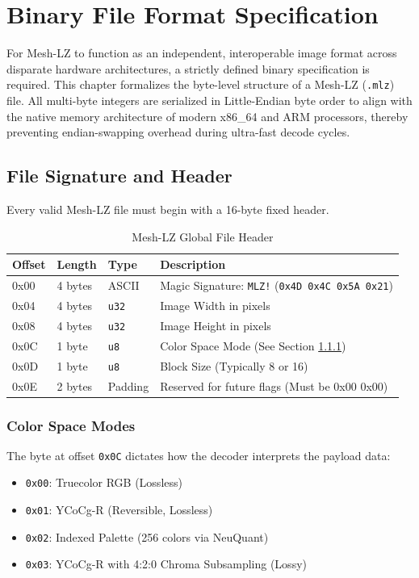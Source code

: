 \chapter{Binary File Format Specification}
\label{ch:spec}

For Mesh-LZ to function as an independent, interoperable image format across disparate hardware architectures, a strictly defined binary specification is required. This chapter formalizes the byte-level structure of a Mesh-LZ (\texttt{.mlz}) file. All multi-byte integers are serialized in Little-Endian byte order to align with the native memory architecture of modern x86\_64 and ARM processors, thereby preventing endian-swapping overhead during ultra-fast decode cycles.

\section{File Signature and Header}
Every valid Mesh-LZ file must begin with a 16-byte fixed header.

\begin{table}[h!]
\centering
\begin{tabular}{|l|l|l|l|}
\hline
\textbf{Offset} & \textbf{Length} & \textbf{Type} & \textbf{Description} \\
\hline
0x00 & 4 bytes & ASCII & Magic Signature: \texttt{MLZ!} (\texttt{0x4D 0x4C 0x5A 0x21}) \\
0x04 & 4 bytes & \texttt{u32} & Image Width in pixels \\
0x08 & 4 bytes & \texttt{u32} & Image Height in pixels \\
0x0C & 1 byte & \texttt{u8} & Color Space Mode (See Section \ref{sec:color_mode}) \\
0x0D & 1 byte & \texttt{u8} & Block Size (Typically 8 or 16) \\
0x0E & 2 bytes & Padding & Reserved for future flags (Must be 0x00 0x00) \\
\hline
\end{tabular}
\caption{Mesh-LZ Global File Header}
\end{table}

\subsection{Color Space Modes}
\label{sec:color_mode}
The byte at offset \texttt{0x0C} dictates how the decoder interprets the payload data:
\begin{itemize}
    \item \texttt{0x00}: Truecolor RGB (Lossless)
    \item \texttt{0x01}: YCoCg-R (Reversible, Lossless)
    \item \texttt{0x02}: Indexed Palette (256 colors via NeuQuant)
    \item \texttt{0x03}: YCoCg-R with 4:2:0 Chroma Subsampling (Lossy)
\end{itemize}

